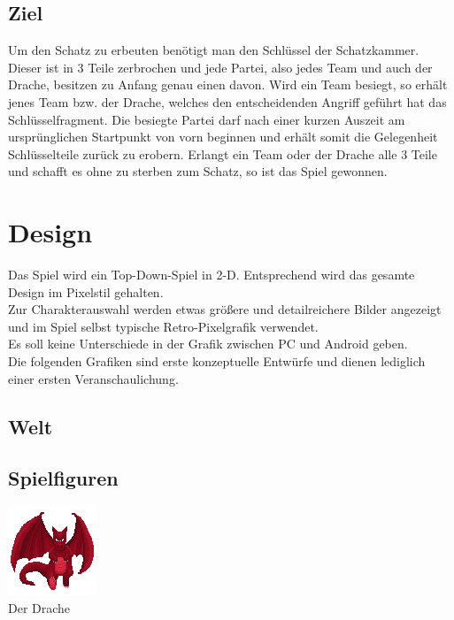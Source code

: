 \documentclass[10pt,a4paper,notitlepage]{report}
\begin{document}
\begin{flushleft}
\section{Ziel}
Um den Schatz zu erbeuten benötigt man den Schlüssel der Schatzkammer. Dieser ist in 3 Teile zerbrochen und jede Partei, also jedes Team und auch der Drache, besitzen zu Anfang genau einen davon. Wird ein Team besiegt, so erhält jenes Team bzw. der Drache, welches den entscheidenden Angriff geführt hat das Schlüsselfragment. Die besiegte Partei darf nach einer kurzen Auszeit am ursprünglichen Startpunkt von vorn beginnen und erhält somit die Gelegenheit Schlüsselteile zurück zu erobern. Erlangt ein Team oder der Drache alle 3 Teile und schafft es ohne zu sterben zum Schatz, so ist das Spiel gewonnen.\\

\chapter{Design}
Das Spiel wird ein Top-Down-Spiel in 2-D. Entsprechend wird das gesamte Design im Pixelstil gehalten.\\
Zur Charakterauswahl werden etwas größere und detailreichere Bilder angezeigt und im Spiel selbst typische Retro-Pixelgrafik verwendet.\\
Es soll keine Unterschiede in der Grafik zwischen PC und Android geben.\\
Die folgenden Grafiken sind erste konzeptuelle Entwürfe und dienen lediglich einer ersten Veranschaulichung.\\

\section{Welt}
\section{Spielfiguren}
\begin{center}
	\includegraphics[scale=3]{Drache.png}\\
	Der Drache\\
		

\end{center}
\end{flushleft}
\end{document}
